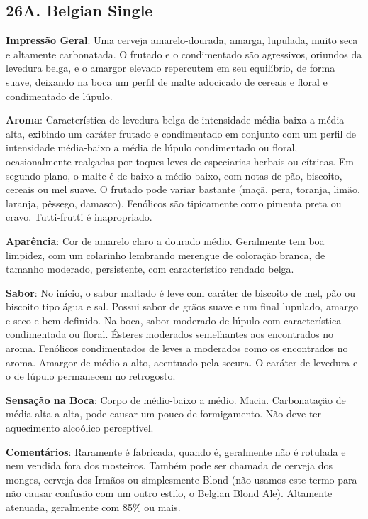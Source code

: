 \subsection*{26A. Belgian Single}
\textbf{Impressão Geral}: Uma cerveja amarelo-dourada, amarga, lupulada, muito seca e altamente carbonatada. O frutado e o condimentado são agressivos, oriundos da levedura belga, e o amargor elevado repercutem em seu equilíbrio, de forma suave, deixando na boca um perfil de malte adocicado de cereais e floral e condimentado de lúpulo.

\textbf{Aroma}: Característica de levedura belga de intensidade média-baixa a média-alta, exibindo um caráter frutado e condimentado em conjunto com um perfil de intensidade média-baixo a média de lúpulo condimentado ou floral, ocasionalmente realçadas por toques leves de especiarias herbais ou cítricas. Em segundo plano, o malte é de baixo a médio-baixo, com notas de pão, biscoito, cereais ou mel suave. O frutado pode variar bastante (maçã, pera, toranja, limão, laranja, pêssego, damasco). Fenólicos são tipicamente como pimenta preta ou cravo. Tutti-frutti é inapropriado.

\textbf{Aparência}: Cor de amarelo claro a dourado médio. Geralmente tem boa limpidez, com um colarinho lembrando merengue de coloração branca, de tamanho moderado, persistente, com característico rendado belga.

\textbf{Sabor}: No início, o sabor maltado é leve com caráter de biscoito de mel, pão ou biscoito tipo água e sal. Possui sabor de grãos suave e um final lupulado, amargo e seco e bem definido. Na boca, sabor moderado de lúpulo com característica condimentada ou floral. Ésteres moderados semelhantes aos encontrados no aroma. Fenólicos condimentados de leves a moderados como os encontrados no aroma. Amargor de médio a alto, acentuado pela secura. O caráter de levedura e o de lúpulo permanecem no retrogosto.

\textbf{Sensação na Boca}: Corpo de médio-baixo a médio. Macia. Carbonatação de média-alta a alta, pode causar um pouco de formigamento. Não deve ter aquecimento alcoólico perceptível.

\textbf{Comentários}: Raramente é fabricada, quando é, geralmente não é rotulada e nem vendida fora dos mosteiros. Também pode ser chamada de cerveja dos monges, cerveja dos Irmãos ou simplesmente Blond (não usamos este termo para não causar confusão com um outro estilo, o Belgian Blond Ale). Altamente atenuada, geralmente com 85\% ou mais.

